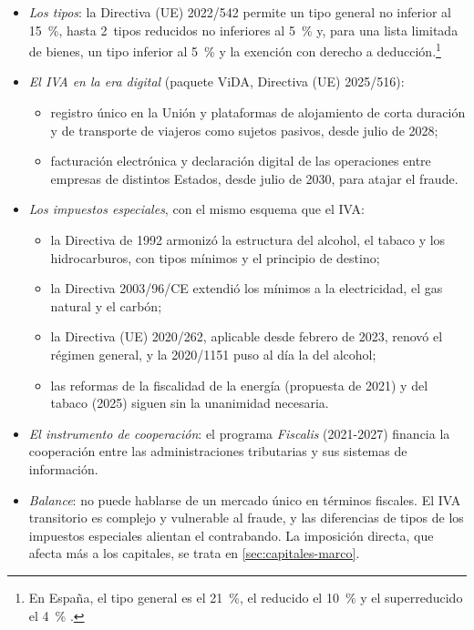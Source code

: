 \documentclass[11pt]{article}
\begin{document}
\begin{itemize}
\begin{itemize}
  \item el «régimen definitivo» en origen nunca llegó, y la Comisión se ha centrado en mejorar el transitorio: los servicios entre empresas tributan en destino por \emph{inversión del sujeto pasivo} desde 2010, y las ventas a distancia y digitales a consumidores, con la ventanilla única (OSS) desde 2021\nocite{UE2006IVA}.
  \end{itemize}
\item \emph{Los tipos}: la Directiva (UE) 2022/542 permite un tipo general no inferior al 15~\%, hasta 2~tipos reducidos no inferiores al 5~\% y, para una lista limitada de bienes, un tipo inferior al 5~\% y la exención con derecho a deducción.\footnote{En España, el tipo general es el 21~\%, el reducido el 10~\% y el superreducido el 4~\% .}
\item \emph{El IVA en la era digital} (paquete ViDA, Directiva (UE) 2025/516)\nocite{CE2026ViDA}:
  \begin{itemize}
  \item registro único en la Unión y plataformas de alojamiento de corta duración y de transporte de viajeros como sujetos pasivos, desde julio de 2028\nocite{CE2026ViDA};
  \item facturación electrónica y declaración digital de las operaciones entre empresas de distintos Estados, desde julio de 2030, para atajar el fraude\nocite{CE2026ViDA}.
  \end{itemize}
\item \emph{Los impuestos especiales}, con el mismo esquema que el IVA:
  \begin{itemize}
  \item la Directiva de 1992 armonizó la estructura del alcohol, el tabaco y los hidrocarburos, con tipos mínimos y el principio de destino;
  \item la Directiva 2003/96/CE extendió los mínimos a la electricidad, el gas natural y el carbón;
  \item la Directiva (UE) 2020/262, aplicable desde febrero de 2023, renovó el régimen general, y la 2020/1151 puso al día la del alcohol\nocite{UE2020ImpuestosEspeciales};
  \item las reformas de la fiscalidad de la energía (propuesta de 2021) y del tabaco (2025) siguen sin la unanimidad necesaria\nocite{CE2026Energia}.
  \end{itemize}
\item \emph{El instrumento de cooperación}: el programa \emph{Fiscalis} (2021-2027) financia la cooperación entre las administraciones tributarias y sus sistemas de información\nocite{UE2021Fiscalis}.
\item \emph{Balance}: no puede hablarse de un mercado único en términos fiscales. El IVA transitorio es complejo y vulnerable al fraude, y las diferencias de tipos de los impuestos especiales alientan el contrabando. La imposición directa, que afecta más a los capitales, se trata en \ref{sec:capitales-marco}.
\end{itemize}
\end{document}
